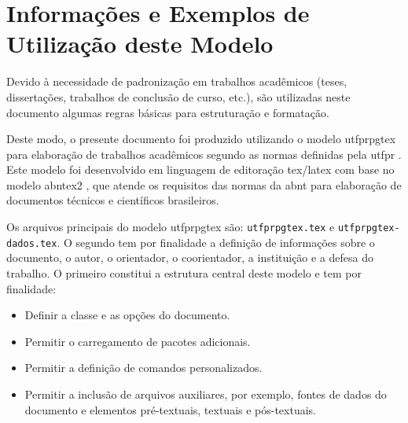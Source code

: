 
\chapter{Informações e Exemplos de Utilização deste Modelo}\label{cap:exemplo}

Devido à necessidade de padronização em trabalhos acadêmicos (teses, dissertações, trabalhos de conclusão de curso, etc.), são utilizadas neste documento algumas regras básicas para estruturação e formatação.

Deste modo, o presente documento foi produzido utilizando o modelo \gls{utfprpgtex} para elaboração de trabalhos acadêmicos segundo as normas definidas pela \gls{utfpr} \cite{UTFPR2008}. Este modelo foi desenvolvido em linguagem de editoração \gls{tex}/\gls{latex} com base no modelo \gls{abntex2} \cite{abnTeX2:2013}, que atende os requisitos das normas da \gls{abnt} para elaboração de documentos técnicos e científicos brasileiros.

Os arquivos principais do modelo \gls{utfprpgtex} são: \texttt{utfprpgtex.tex} e \texttt{utfprpgtex-dados.tex}. O segundo tem por finalidade a definição de informações sobre o documento, o autor, o orientador, o coorientador, a instituição e a defesa do trabalho. O primeiro constitui a estrutura central deste modelo e tem por finalidade:

\begin{itemize}%
\item Definir a classe e as opções do documento.
\item Permitir o carregamento de pacotes adicionais.
\item Permitir a definição de comandos personalizados.
\item Permitir a inclusão de arquivos auxiliares, por exemplo, fontes de dados do documento e elementos pré-textuais, textuais e pós-textuais.
\end{itemize}

